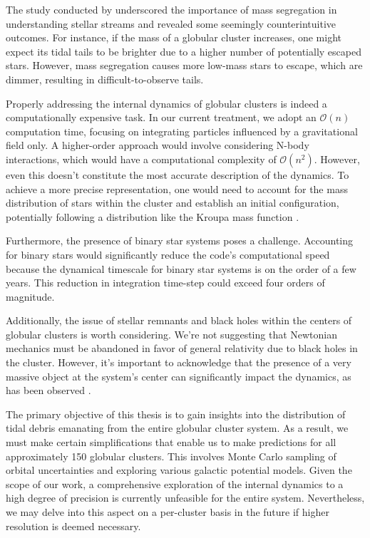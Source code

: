 The study conducted by \citet{2018MNRAS.474.2479B} underscored the importance of mass segregation in understanding stellar streams and revealed some seemingly counterintuitive outcomes. For instance, if the mass of a globular cluster increases, one might expect its tidal tails to be brighter due to a higher number of potentially escaped stars. However, mass segregation causes more low-mass stars to escape, which are dimmer, resulting in difficult-to-observe tails.

Properly addressing the internal dynamics of globular clusters is indeed a computationally expensive task. In our current treatment, we adopt an $\mathcal{O}(n)$ computation time, focusing on integrating particles influenced by a gravitational field only. A higher-order approach would involve considering N-body interactions, which would have a computational complexity of $\mathcal{O}(n^2)$. However, even this doesn't constitute the most accurate description of the dynamics. To achieve a more precise representation, one would need to account for the mass distribution of stars within the cluster and establish an initial configuration, potentially following a distribution like the Kroupa mass function \citep{2001MNRAS.322..231K}.

Furthermore, the presence of binary star systems poses a challenge. Accounting for binary stars would significantly reduce the code's computational speed because the dynamical timescale for binary star systems is on the order of a few years. This reduction in integration time-step could exceed four orders of magnitude.

Additionally, the issue of stellar remnants and black holes within the centers of globular clusters is worth considering. We're not suggesting that Newtonian mechanics must be abandoned in favor of general relativity due to black holes in the cluster. However, it's important to acknowledge that the presence of a very massive object at the system's center can significantly impact the dynamics, as has been observed \citep{2023MNRAS.522.5740V}.

The primary objective of this thesis is to gain insights into the distribution of tidal debris emanating from the entire globular cluster system. As a result, we must make certain simplifications that enable us to make predictions for all approximately 150 globular clusters. This involves Monte Carlo sampling of orbital uncertainties and exploring various galactic potential models. Given the scope of our work, a comprehensive exploration of the internal dynamics to a high degree of precision is currently unfeasible for the entire system. Nevertheless, we may delve into this aspect on a per-cluster basis in the future if higher resolution is deemed necessary.

